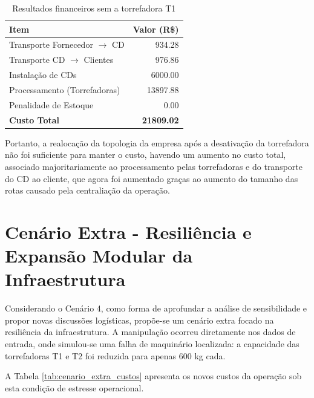 \documentclass[a4paper,11pt]{article}
\begin{document}
\begin{table}[h]
\centering

\label{tab:resultados_financeiros}
\begin{tabular}{lr}
\hline
\textbf{Item} & \textbf{Valor (R\$)} \\
\hline
Transporte Fornecedor $\rightarrow$ CD & 934.28 \\
Transporte CD $\rightarrow$ Clientes & 976.86 \\
Instalação de CDs & 6000.00 \\
Processamento (Torrefadoras) & 13897.88 \\
Penalidade de Estoque & 0.00 \\
\hline
\textbf{Custo Total} & \textbf{21809.02} \\
\hline
\end{tabular}

\caption{Resultados financeiros sem a torrefadora T1}
\end{table}

\newpage
Portanto, a realocação da topologia da empresa após a desativação da torrefadora não foi suficiente para manter o custo, havendo um aumento no custo total, associado majoritariamente ao processamento pelas torrefadoras e do transporte do CD ao cliente, que agora foi aumentado graças ao aumento do tamanho das rotas causado pela centraliação da operação.

\section{Cenário Extra - Resiliência e Expansão Modular da Infraestrutura}

Considerando o Cenário 4, como forma de aprofundar a análise de sensibilidade e propor novas discussões logísticas, propõe-se um cenário extra focado na resiliência da infraestrutura. A manipulação ocorreu diretamente nos dados de entrada, onde simulou-se uma falha de maquinário localizada: a capacidade das torrefadoras T1 e T2 foi reduzida para apenas 600 kg cada.

A Tabela \ref{tab:cenario_extra_custos} apresenta os novos custos da operação sob esta condição de estresse operacional.
\end{document}
